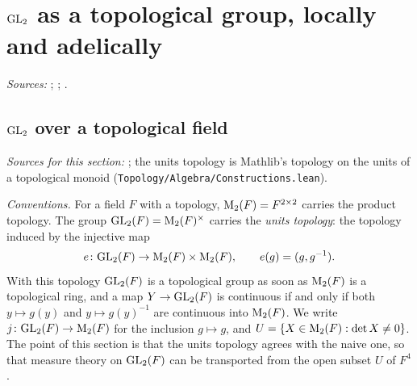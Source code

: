 
\chapter{\texorpdfstring{$\mathrm{GL}_2$ as a topological group, locally and adelically}{GL₂ as a topological group, locally and adelically}}\label{ch:ch-0-04-top-groups}

\noindent\emph{Sources:} \cite[§2]{AIntro}; \cite{GH}; \cite{Bor-fin}.

\section{\texorpdfstring{$\mathrm{GL}_2$ over a topological field}{GL₂ over a topological field}}\label{sec:topgrp-field}

\noindent\emph{Sources for this section:} \cite[§2]{AIntro}; the units topology is Mathlib's topology on the units
of a topological monoid (\texttt{Topology/\allowbreak Algebra/\allowbreak Constructions.lean}).

\emph{Conventions.} For a field $F$ with a topology, $\mathrm{M}_2(F)=F^{2\times2}$ carries the product topology. The group
$\mathrm{GL}_2(F)=\mathrm{M}_2(F)^\times$ carries the \emph{units topology}: the topology induced by the injective map
\[
  e\colon\mathrm{GL}_2(F)\to\mathrm{M}_2(F)\times\mathrm{M}_2(F),\qquad e(g)=(g,g^{-1}).
\]
With this topology $\mathrm{GL}_2(F)$ is a topological group as soon as $\mathrm{M}_2(F)$ is a topological ring, and a map
$Y\to\mathrm{GL}_2(F)$ is continuous if and only if both $y\mapsto g(y)$ and $y\mapsto g(y)^{-1}$ are continuous into
$\mathrm{M}_2(F)$. We write $j\colon\mathrm{GL}_2(F)\to\mathrm{M}_2(F)$ for the inclusion $g\mapsto g$, and
$U=\{X\in\mathrm{M}_2(F):\det X\neq0\}$. The point of this section is that the units topology agrees with the naive one,
so that measure theory on $\mathrm{GL}_2(F)$ can be transported from the open subset $U$ of $F^4$.

